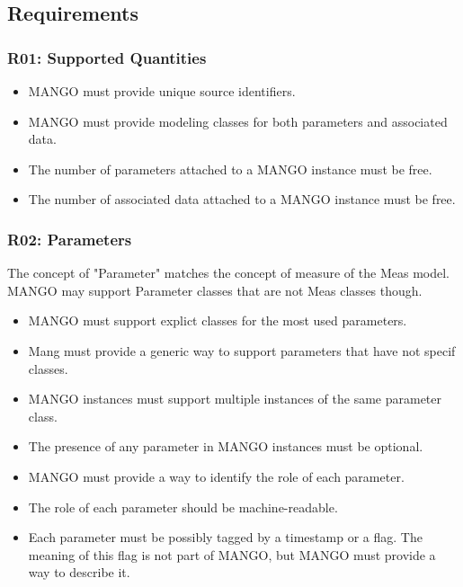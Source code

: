 \documentclass[11pt,a4paper]{ivoa}
\begin{document}
\subsection{Requirements}

\subsubsection{R01: Supported Quantities}
\begin{itemize}
    \item MANGO must provide unique source identifiers.
    \item MANGO must provide modeling classes for both parameters and associated data.
    \item The number of parameters attached to a MANGO instance must be free.
    \item The number of associated data attached to a MANGO instance must be free.
\end{itemize}

\subsubsection{R02: Parameters}
The concept of "Parameter" matches the concept of measure of the Meas model. MANGO may support Parameter classes that are not Meas classes though.

\begin{itemize}
    \item MANGO must support explict classes for the most used parameters.
    \item Mang must provide a generic way to support parameters that have not specif classes.
    \item MANGO instances must support multiple instances of the same parameter class.
    \item The presence of any parameter in MANGO instances must be optional.
    \item MANGO must provide a way to identify the role of each parameter.
    \item The role of each parameter should be machine-readable.
    \item Each parameter must be possibly tagged by a timestamp or a flag. The meaning of this flag is not part of MANGO, but MANGO must provide a way to describe it.
\end{itemize}
\end{document}
